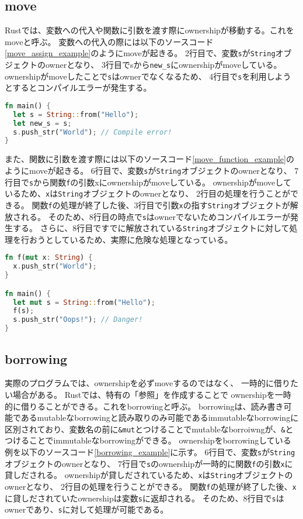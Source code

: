 \documentclass{sumiilab-paper}
\theoremstyle{mystyle}
\numberwithin{definition}{chapter} %
\begin{document}
\subsection{move}
Rustでは、変数への代入や関数に引数を渡す際にownershipが移動する。これをmoveと呼ぶ。
変数への代入の際には以下のソースコード\ref{move_assign_example}のようにmoveが起きる。
2行目で、変数\texttt{s}が\texttt{String}オブジェクトのownerとなり、
3行目でsから\texttt{new\_s}にownershipがmoveしている。
ownershipがmoveしたことで\texttt{s}はownerでなくなるため、
4行目で\texttt{s}を利用しようとするとコンパイルエラーが発生する。
\begin{lstlisting}[language=Rust, caption=変数への代入でmoveが起こる例, label=move_assign_example, captionpos=b]
fn main() {
  let s = String::from("Hello");
  let new_s = s;
  s.push_str("World"); // Compile error!
}    
\end{lstlisting}
また、関数に引数を渡す際には以下のソースコード\ref{move_function_example}のようにmoveが起きる。
6行目で、変数\texttt{s}が\texttt{String}オブジェクトのownerとなり、
7行目で\texttt{s}から関数\texttt{f}の引数xにownershipがmoveしている。
ownershipがmoveしているため、\texttt{x}は\texttt{String}オブジェクトのownerとなり、
2行目の処理を行うことができる。
関数\texttt{f}の処理が終了した後、3行目で引数\texttt{x}の指す\texttt{String}オブジェクトが解放される。
そのため、8行目の時点で\texttt{s}はownerでないためコンパイルエラーが発生する。
さらに、8行目ですでに解放されている\texttt{String}オブジェクトに対して処理を行おうとしているため、実際に危険な処理となっている。
\begin{lstlisting}[language=Rust, caption=関数に引数を渡す際にmoveが起こる例, label=move_function_example, captionpos=b]
fn f(mut x: String) {
  x.push_str("World");
}

fn main() {
  let mut s = String::from("Hello");
  f(s);
  s.push_str("Oops!"); // Danger!
}
\end{lstlisting}

\subsection{borrowing}
実際のプログラムでは、ownershipを必ずmoveするのではなく、
一時的に借りたい場合がある。
Rustでは、特有の「参照」を作成することで
ownershipを一時的に借りることができる。これをborrowingと呼ぶ。
borrowingは、読み書き可能であるmutableなborrowingと読み取りのみ可能であるimmutableなborrowingに区別されており、変数名の前に\texttt{\&mut}とつけることでmutableなborroiwngが、\texttt{\&}とつけることでimmutableなborrowingができる。
ownershipをborrowingしている例を以下のソースコード\ref{borrowing_example}に示す。
6行目で、変数\texttt{s}が\texttt{String}オブジェクトのownerとなり、
7行目で\texttt{s}のownershipが一時的に関数\texttt{f}の引数\texttt{x}に貸しだされる。
ownershipが貸しだされているため、\texttt{x}は\texttt{String}オブジェクトのownerとなり、
2行目の処理を行うことができる。
関数\texttt{f}の処理が終了した後、\texttt{x}に貸しだされていたownershipは変数\texttt{s}に返却される。
そのため、8行目で\texttt{s}はownerであり、\texttt{s}に対して処理が可能である。
\end{document}
